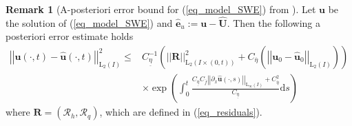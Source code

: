 \documentclass[12pt,a4paper]{article}
\numberwithin{equation}{section}
\theoremstyle{definition}
\newcommand{\Norm}[1]{\left|\left|#1\right|\right|}
\newcommand{\vect}[1]{\textbf{#1}}
\newcommand{\leb}{\text{L}}
\newcommand{\Coeta}{C_{\overline{\eta}}}
\newcommand{\Cof}{C_{\overline{f}}}
\newcommand{\Cueta}{C_{\underline{\eta}}}
\newcommand{\qp}[1]{\left(#1\right)}
\newcommand{\rec}[1]{\widehat{{#1}}}
\newtheorem{Rem}[subsection]{Remark}
\begin{document}
\begin{Rem}[A-posteriori error bound for (\ref{eq_model_SWE}) from \cite{giesselmann2015posteriori}]\label{thm:bound}
Let $\vect{u}$ be the solution of (\ref{eq_model_SWE}) and $ \widehat{\vect{e}}_u:=\vect{u}-\rec{\vect{U}}$. Then the following a posteriori error estimate holds
\begin{equation}\label{eq_bound}
\begin{aligned}
\Norm{\vect{u}\qp{\cdot,t}- \widehat{\vect{u}}\qp{\cdot,t}}_{\leb_2\qp{I}}^2\leq& C_{\underline{\eta}}^{-1}\qp{\Norm{\vect{R}}^2_{\leb_2\qp{I\times\qp{0,t}}} +C_{\overline{\eta}}\qp{\Norm{\vect{u}_0-\rec{\vect{u}}_0}_{\leb_2\qp{I}}}}\\
&\times\exp\qp{\int^t_0\frac{\Cueta\Cof\Norm{\partial_x\rec{\vect{u}}\qp{\cdot,s}}_{\leb_\infty\qp{I}}+\Coeta^2}{\Cueta}\mathrm{d}s}
\end{aligned}
\end{equation}
where $\vect{R}=\qp{\mathcal{R}_h,\mathcal{R}_q}$, which are defined in (\ref{eq_residuals}).
\end{Rem}
\end{document}
